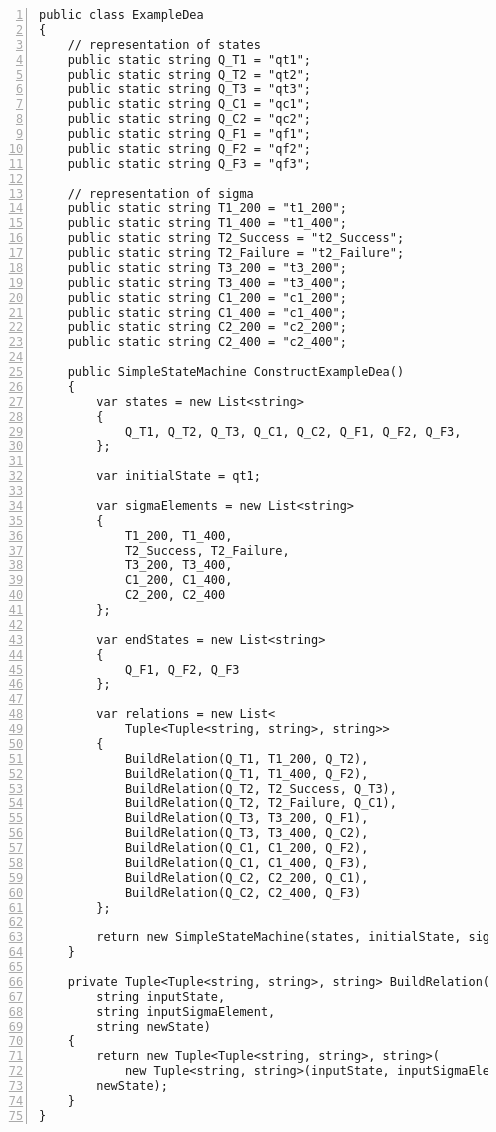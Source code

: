 \begin{lstlisting}[language={[Sharp]C}, breaklines=true, tabsize=2, showstringspaces=false, frame=single, numbers=left, basicstyle=\small] 
public class ExampleDea
{
 	// representation of states
	public static string Q_T1 = "qt1";
	public static string Q_T2 = "qt2";
	public static string Q_T3 = "qt3";
	public static string Q_C1 = "qc1";
	public static string Q_C2 = "qc2";
	public static string Q_F1 = "qf1";
	public static string Q_F2 = "qf2";
	public static string Q_F3 = "qf3";
	
	// representation of sigma
	public static string T1_200 = "t1_200";
	public static string T1_400 = "t1_400";
	public static string T2_Success = "t2_Success";
	public static string T2_Failure = "t2_Failure";
	public static string T3_200 = "t3_200";
	public static string T3_400 = "t3_400";
	public static string C1_200 = "c1_200";
	public static string C1_400 = "c1_400";
	public static string C2_200 = "c2_200";
	public static string C2_400 = "c2_400";
	
	public SimpleStateMachine ConstructExampleDea()
	{
		var states = new List<string>
		{
			Q_T1, Q_T2, Q_T3, Q_C1, Q_C2, Q_F1, Q_F2, Q_F3,
		};
		
		var initialState = qt1;
		
		var sigmaElements = new List<string>
		{
			T1_200, T1_400,
			T2_Success, T2_Failure,
			T3_200, T3_400,
			C1_200, C1_400,
			C2_200, C2_400
		};
		
		var endStates = new List<string>
		{
			Q_F1, Q_F2, Q_F3
		};
		
		var relations = new List<
			Tuple<Tuple<string, string>, string>>
		{
			BuildRelation(Q_T1, T1_200, Q_T2),
			BuildRelation(Q_T1, T1_400, Q_F2),
			BuildRelation(Q_T2, T2_Success, Q_T3),
			BuildRelation(Q_T2, T2_Failure, Q_C1),
			BuildRelation(Q_T3, T3_200, Q_F1),
			BuildRelation(Q_T3, T3_400, Q_C2),
			BuildRelation(Q_C1, C1_200, Q_F2),
			BuildRelation(Q_C1, C1_400, Q_F3),
			BuildRelation(Q_C2, C2_200, Q_C1),
			BuildRelation(Q_C2, C2_400, Q_F3)
		};
		
		return new SimpleStateMachine(states, initialState, sigmaElements, endStates, relations); 
	}
	
	private Tuple<Tuple<string, string>, string> BuildRelation(
		string inputState, 
		string inputSigmaElement, 
		string newState)
	{
		return new Tuple<Tuple<string, string>, string>(
			new Tuple<string, string>(inputState, inputSigmaElement), 
		newState);
	}
}
\end{lstlisting}\label{code_simple_dea}

